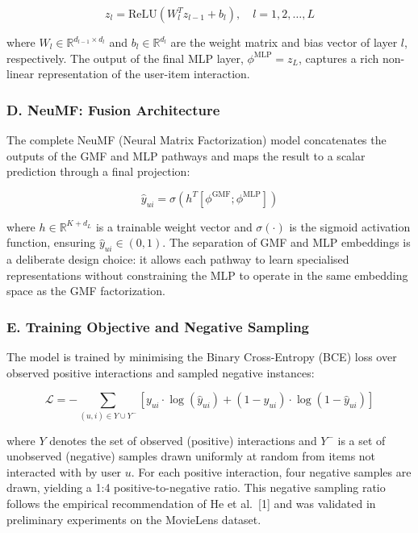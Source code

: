 \documentclass[
]{IEEEtran}
\begin{document}
\[z_l = \text{ReLU}(W_l^T z_{l-1} + b_l), \quad l = 1, 2, \dots, L\]

where \(W_l \in \mathbb{R}^{d_{l-1} \times d_l}\) and
\(b_l \in \mathbb{R}^{d_l}\) are the weight matrix and bias vector of
layer \(l\), respectively. The output of the final MLP layer,
\(\phi^{\text{MLP}} = z_L\), captures a rich non-linear representation
of the user-item interaction.

\subsubsection{D. NeuMF: Fusion
Architecture}\label{d.-neumf-fusion-architecture}

The complete NeuMF (Neural Matrix Factorization) model concatenates the
outputs of the GMF and MLP pathways and maps the result to a scalar
prediction through a final projection:

\[\hat{y}_{ui} = \sigma(h^T [\phi^{\text{GMF}} ; \phi^{\text{MLP}}])\]

where \(h \in \mathbb{R}^{K + d_L}\) is a trainable weight vector and
\(\sigma(\cdot)\) is the sigmoid activation function, ensuring
\(\hat{y}_{ui} \in (0, 1)\). The separation of GMF and MLP embeddings is
a deliberate design choice: it allows each pathway to learn specialised
representations without constraining the MLP to operate in the same
embedding space as the GMF factorization.

\subsubsection{E. Training Objective and Negative
Sampling}\label{e.-training-objective-and-negative-sampling}

The model is trained by minimising the Binary Cross-Entropy (BCE) loss
over observed positive interactions and sampled negative instances:

\[\mathcal{L} = -\sum_{(u,i) \in Y \cup Y^-} \left[ y_{ui} \cdot \log(\hat{y}_{ui}) + (1 - y_{ui}) \cdot \log(1 - \hat{y}_{ui}) \right]\]

where \(Y\) denotes the set of observed (positive) interactions and
\(Y^-\) is a set of unobserved (negative) samples drawn uniformly at
random from items not interacted with by user \(u\). For each positive
interaction, four negative samples are drawn, yielding a 1:4
positive-to-negative ratio. This negative sampling ratio follows the
empirical recommendation of He et al.~{[}1{]} and was validated in
preliminary experiments on the MovieLens dataset.
\end{document}
